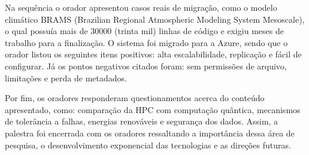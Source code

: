 Na sequência o orador apresentou casos reais de migração, como o modelo climático BRAMS (Brazilian Regional Atmospheric Modeling System Mesoscale), o qual possuía mais de 30000 (trinta mil) linhas de código e exigiu meses de trabalho para a finalização. O sistema foi migrado para a Azure, sendo que o orador listou os seguintes itens positivos: alta escalabilidade, replicação e fácil de configurar. Já os pontos negativos citados foram: sem permissões de arquivo, limitações e perda de metadados.

Por fim, os oradores responderam questionamentos acerca do conteúdo apresentado, como: comparação da HPC com computação quântica, mecanismos de tolerância a falhas, energias renováveis e segurança dos dados. Assim, a palestra foi encerrada com os oradores ressaltando a importância dessa área de pesquisa, o desenvolvimento exponencial das tecnologias e as direções futuras.
